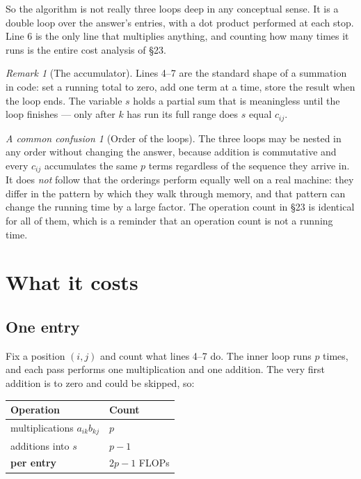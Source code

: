 \documentclass[11pt]{article}
\theoremstyle{plain}
\theoremstyle{definition}
\theoremstyle{remark}
\newtheorem*{rmk}{Remark}
\newtheorem*{warn}{A common confusion}
\begin{document}
\noindent So the algorithm is not really three loops deep in any conceptual
sense. It is a double loop over the answer's entries, with a dot product
performed at each stop. Line 6 is the only line that multiplies anything, and
counting how many times it runs is the entire cost analysis of \S23.

\begin{rmk}[The accumulator]
Lines 4--7 are the standard shape of a summation in code: set a running total to
zero, add one term at a time, store the result when the loop ends. The variable
$s$ holds a partial sum that is meaningless until the loop finishes --- only
after $k$ has run its full range does $s$ equal $c_{ij}$.
\end{rmk}

\begin{warn}[Order of the loops]
The three loops may be nested in any order without changing the answer, because
addition is commutative and every $c_{ij}$ accumulates the same $p$ terms
regardless of the sequence they arrive in. It does \emph{not} follow that the
orderings perform equally well on a real machine: they differ in the pattern by
which they walk through memory, and that pattern can change the running time by
a large factor. The operation count in \S23 is identical for all of them, which
is a reminder that an operation count is not a running time.
\end{warn}

\section{What it costs}

\subsection{One entry}
Fix a position $(i,j)$ and count what lines 4--7 do. The inner loop runs $p$
times, and each pass performs one multiplication and one addition. The very
first addition is to zero and could be skipped, so:
\begin{center}
\renewcommand{\arraystretch}{1.3}
\begin{tabular}{@{}l l@{}}
\toprule
\textbf{Operation} & \textbf{Count} \\
\midrule
multiplications $a_{ik}b_{kj}$ & $p$ \\
additions into $s$             & $p-1$ \\
\midrule
\textbf{per entry}             & $2p-1$ FLOPs \\
\bottomrule
\end{tabular}
\end{center}
\end{document}
